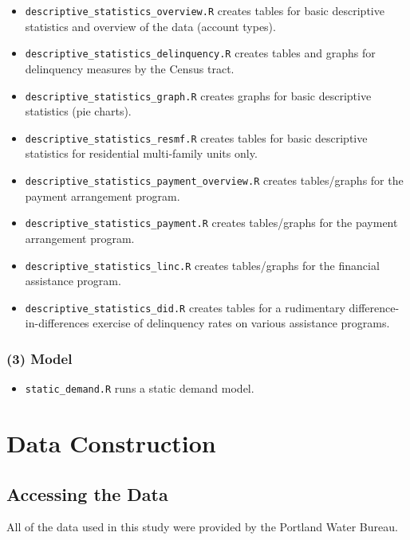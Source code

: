 \documentclass[11pt]{article}
\begin{document}
\begin{itemize}
	\item \texttt{descriptive\_statistics\_overview.R} creates tables for basic descriptive statistics and overview of the data (account types).
	\item \texttt{descriptive\_statistics\_delinquency.R} creates tables and graphs for delinquency measures by the Census tract.
	\item \texttt{descriptive\_statistics\_graph.R} creates graphs for basic descriptive statistics (pie charts).
	\item \texttt{descriptive\_statistics\_resmf.R} creates tables for basic descriptive statistics for residential multi-family units only.
	\item \texttt{descriptive\_statistics\_payment\_overview.R} creates tables/graphs for the payment arrangement program.
	\item \texttt{descriptive\_statistics\_payment.R} creates tables/graphs for the payment arrangement program.
	\item \texttt{descriptive\_statistics\_linc.R} creates tables/graphs for the financial assistance program.
	\item \texttt{descriptive\_statistics\_did.R} creates tables for a rudimentary difference-in-differences exercise of delinquency rates on various assistance programs.
\end{itemize}

\subsubsection*{(3) Model}

\begin{itemize}
	\item \texttt{static\_demand.R} runs a static demand model.
\end{itemize}

\pagebreak

\section*{Data Construction}

\subsection*{Accessing the Data}

All of the data used in this study were provided by the Portland Water Bureau.
\end{document}

